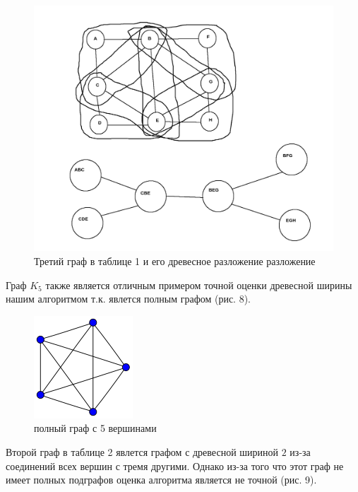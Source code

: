 \documentclass[a4paper,12pt]{article}
\begin{document}
\begin{large}
\begin{large}
		\begin{figure}[htbp]
			\centering
				\includegraphics[scale=0.3]{graph3_example.png}
				\caption{Третий граф в таблице 1 и его древесное разложение разложение}
				\label{fig:testImage}
		\end{figure}

		Граф $K_5$ также является отличным примером точной оценки древесной ширины нашим алгоритмом т.к. явлется полным графом (рис. 8).

		\begin{figure}[htbp]
			\centering
				\includegraphics[scale=0.5]{5-vertices_graph.png}
				\caption{полный граф с 5 вершинами}
				\label{fig:testImage}
		\end{figure}

		Второй граф в таблице 2 явлется графом с древесной шириной $2$ из-за соединений всех вершин с тремя другими. Однако из-за того что этот граф не имеет полных подграфов оценка алгоритма является не точной (рис. 9).


\end{large}
\end{large}
\end{document}
